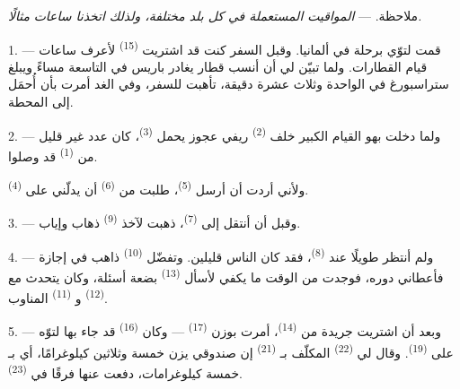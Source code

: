 
\VUsaut{4.0mm}
\VUsaut{2.4mm}
\VUsaut{3.4mm}
\textsc{ملاحظة.} --- \textit{المواقيت المستعملة في كل بلد مختلفة، ولذلك
اتخذنا ساعات}  \textit{مثالًا.}

1. --- قمت لتوّي برحلة في ألمانيا. وقبل السفر كنت قد اشتريت  \textsuperscript{(15)} لأعرف ساعات قيام القطارات. ولما تبيّن لي أن
أنسب قطار يغادر باريس في التاسعة مساءً ويبلغ ستراسبورغ في الواحدة وثلاث
عشرة دقيقة، تأهبت للسفر، وفي الغد أمرت بأن أُحمَل إلى المحطة.

2. --- ولما دخلت بهو القيام الكبير خلف  \textsuperscript{(2)} ريفي
عجوز يحمل  \textsuperscript{(3)}، كان عدد غير قليل من
 \textsuperscript{(1)} قد وصلوا.

ولأني أردت أن أرسل  \textsuperscript{(5)}، طلبت من 
\textsuperscript{(6)} أن يدلّني على  \textsuperscript{(4)}.

3. --- وقبل أن أنتقل إلى  \textsuperscript{(7)}، ذهبت
لآخذ  \textsuperscript{(9)} ذهاب وإياب.

4. --- ولم أنتظر طويلًا عند  \textsuperscript{(8)}، فقد كان
الناس قليلين. وتفضّل  \textsuperscript{(10)} ذاهب في إجازة فأعطاني
دوره، فوجدت من الوقت ما يكفي لأسأل  \textsuperscript{(13)}
بضعة أسئلة، وكان يتحدث مع  \textsuperscript{(12)}
و \textsuperscript{(11)} المناوب.

\VUsaut{3.0mm}

5. --- وبعد أن اشتريت جريدة من  \textsuperscript{(14)}، أمرت
بوزن  \textsuperscript{(17)} --- وكان  \textsuperscript{(16)}
قد جاء بها لتوّه على  \textsuperscript{(19)}. وقال لي
 \textsuperscript{(22)} المكلّف بـ \textsuperscript{(21)}
إن صندوقي يزن خمسة وثلاثين كيلوغرامًا، أي بـ خمسة
كيلوغرامات، دفعت عنها فرقًا في  \textsuperscript{(23)}.

